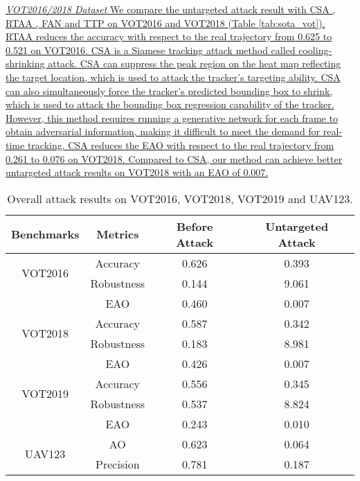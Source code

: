 \documentclass[12pt]{article}
\begin{document}
\uline{
\textit{VOT2016/2018 Dataset} We compare the untargeted attack result with CSA \cite{CSA}, RTAA \cite{RTAA}, FAN \cite{FAN} and TTP \cite{TTP} on VOT2016 and VOT2018 (Table \ref{tab:sota_vot}). 
RTAA reduces the accuracy with respect to the real trajectory from 0.625 to 0.521 on VOT2016.
CSA \cite{CSA} is a Siamese tracking attack method called cooling-shrinking attack. CSA can suppress the peak region on the heat map reflecting the target location, which is used to attack the tracker's targeting ability. CSA can also simultaneously force the tracker's predicted bounding box to shrink, which is used to attack the bounding box regression capability of the tracker. However, this method requires running a generative network for each frame to obtain adversarial information, making it difficult to meet the demand for real-time tracking. CSA reduces the EAO with respect to the real trajectory from 0.261 to 0.076 on VOT2018. Compared to CSA, our method can achieve better untargeted attack results on VOT2018 with an EAO of 0.007.
}

\begin{table}[t]
    \renewcommand\thetable{IV} 
    \centering
    \caption{Overall attack results on VOT2016, VOT2018, VOT2019 and UAV123.}
    \begin{tabular}{c c | c | c}
    \toprule
    Benchmarks & Metrics & Before Attack    & Untargeted Attack  \\
    \midrule
    \multirow{2}{*}[-6pt]{VOT2016} 
    & Accuracy   & 0.626 & 0.393\\
    & Robustness & 0.144 & 9.061\\
    & EAO        & 0.460 & 0.007\\
    \midrule
    \multirow{2}{*}[-6pt]{VOT2018} 
    & Accuracy   & 0.587 & 0.342\\
    & Robustness & 0.183 & 8.981\\
    & EAO        & 0.426 & 0.007\\
    \midrule
    \multirow{2}{*}[-6pt]{VOT2019} 
    & Accuracy   & 0.556 & 0.345\\
    & Robustness & 0.537 & 8.824\\
    & EAO        & 0.243 & 0.010\\
    \midrule
    \multirow{3}{*}[+6pt]{UAV123} 
    & AO  & 0.623 & 0.064\\
    & Precision & 0.781 & 0.187\\
    \bottomrule
    \end{tabular}
    \label{tab:benchmark results1}
\end{table}
\end{document}
